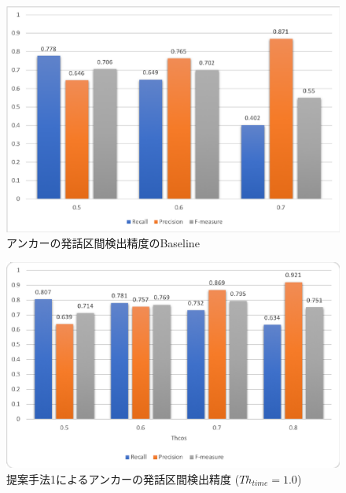 \begin{figure}[H]
  \begin{center}
    \includegraphics[scale=0.8]{./figure/get_anchor_baseline.eps}
  \end{center}
  \caption{アンカーの発話区間検出精度のBaseline \label{fig:result_anchor_baseline}}
\end{figure}

\begin{figure}[H]
  \begin{center}
    \includegraphics[scale=0.8]{./figure/get_anchor_prob1.eps}
  \end{center}
  \caption{提案手法1によるアンカーの発話区間検出精度 ($Th_{time}=1.0$) \label{fig:result_anchor_prob1}}
\end{figure}

